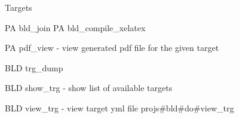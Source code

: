  
 
 
 
 

Targets

PA bld_join
PA bld_compile_xelatex

PA pdf_view - view generated pdf file for the given target

BLD trg_dump

BLD show_trg - show list of available targets

BLD view_trg - view target yml file
projs#bld#do#view_trg 
